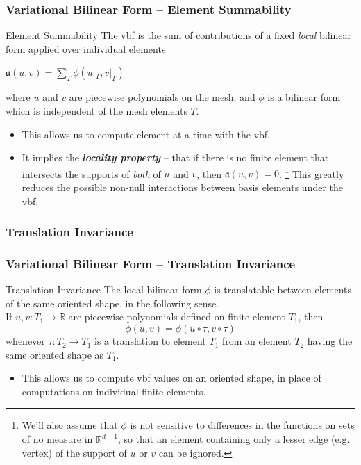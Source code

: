 \documentclass[compress]{beamer}
\begin{document}
\begin{frame}
  \frametitle{Variational Bilinear Form -- Element Summability}
  \begin{block}{Element Summability}
    The vbf is the sum of contributions of a fixed \emph{local} bilinear form applied over individual elements
    \begin{center}$\mathfrak{a}(u,v) = \sum_T { \phi(u|_T,v|_T) }$\end{center}
      where $u$ and $v$ are piecewise polynomials on the mesh, and $\phi$ is a bilinear form which is independent of the mesh elements $T$.
  \end{block}
  \pause
  \begin{itemize}[<+->]
    \item This allows us to compute element-at-a-time with the vbf.
    \item It implies the \emph{\textbf{locality property}} -- that if there is no finite element that intersects the supports of \emph{both}
      of $u$ and $v$, then $\mathfrak{a}(u,v) = 0$.
        \footnote{We'll also assume that $\phi$ is not sensitive to differences in the functions on sets of no measure in $\mathbb{R}^{d-1}$,
                  so that an element containing only a lesser edge (e.g. vertex) of the support of $u$ or $v$ can be ignored.}
      This greatly reduces the possible non-null interactions between basis elements under the vbf.
  \end{itemize}
\end{frame}

\subsubsection{Translation Invariance}

\begin{frame}
  \frametitle{Variational Bilinear Form -- Translation Invariance}
  \begin{block}{Translation Invariance}
  The local bilinear form $\phi$ is translatable between elements of the same oriented shape, in the following sense.\\
  If $u, v: T_1 \rightarrow \mathbb{R}$ are piecewise polynomials defined on finite element $T_1$, then
    $$\phi(u, v) = \phi(u \circ \tau, v \circ \tau)$$
      whenever $\tau: T_2 \rightarrow T_1$ is a translation to element $T_1$ from an element $T_2$ having
      the same oriented shape as $T_1$.
  \end{block}
  \pause
  \begin{itemize}[<+->]
    \item This allows us to compute vbf values on an oriented shape, in place of computations on individual finite elements.
  \end{itemize}
\end{frame}
\end{document}
